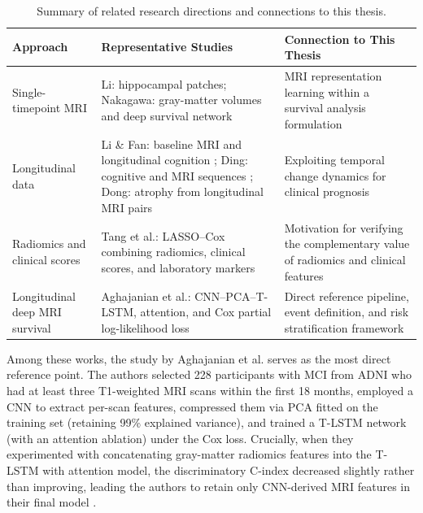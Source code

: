 \begin{table}[H]
\centering\small
\renewcommand{\arraystretch}{1.02}
\caption{Summary of related research directions and connections to this thesis.}
\label{tab:related}
\begin{tabularx}{\linewidth}{@{}L{2.8cm}Y Y@{}}
\toprule
\textbf{Approach} & \textbf{Representative Studies} & \textbf{Connection to This Thesis} \\
\midrule
Single-timepoint MRI & Li: hippocampal patches; Nakagawa: gray-matter volumes and deep survival network \cite{li2019hippocampal,nakagawa2020survival} & MRI representation learning within a survival analysis formulation \\
Longitudinal data & Li \& Fan: baseline MRI and longitudinal cognition \cite{li2019early}; Ding: cognitive and MRI sequences \cite{ding2023progression}; Dong: atrophy from longitudinal MRI pairs \cite{dong2021deepatrophy} & Exploiting temporal change dynamics for clinical prognosis \\
Radiomics and clinical scores & Tang et al.: LASSO--Cox combining radiomics, clinical scores, and laboratory markers \cite{tang2021individualized} & Motivation for verifying the complementary value of radiomics and clinical features \\
Longitudinal deep MRI survival & Aghajanian et al.: CNN--PCA--T-LSTM, attention, and Cox partial log-likelihood loss \cite{aghajanian2025longitudinal} & Direct reference pipeline, event definition, and risk stratification framework \\
\bottomrule
\end{tabularx}
\end{table}

Among these works, the study by Aghajanian et al. \cite{aghajanian2025longitudinal} serves as the most direct reference point. The authors selected 228 participants with MCI from ADNI who had at least three T1-weighted MRI scans within the first 18 months, employed a CNN to extract per-scan features, compressed them via PCA fitted on the training set (retaining 99\% explained variance), and trained a T-LSTM network (with an attention ablation) under the Cox loss. Crucially, when they experimented with concatenating gray-matter radiomics features into the T-LSTM with attention model, the discriminatory C-index decreased slightly rather than improving, leading the authors to retain only CNN-derived MRI features in their final model \cite{aghajanian2025longitudinal}.

